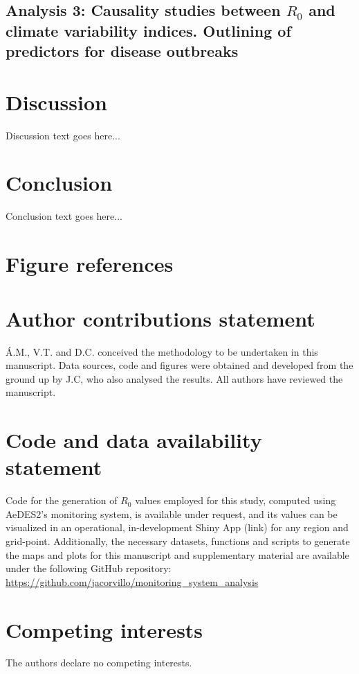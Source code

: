 \documentclass[article,10pt,twocolumn]{wlscirep}
\begin{document}
  \subsection{Analysis 3: Causality studies between $R_0$ and climate variability indices. Outlining of predictors for disease outbreaks} \label{sec-results-3}

  \section{Discussion}

  Discussion text goes here...

  \section{Conclusion}

  Conclusion text goes here...

% 

\section*{Figure references}

\section*{Author contributions statement}

Á.M., V.T. and D.C. conceived the methodology to be undertaken in this manuscript. Data sources, code and figures were obtained and developed from the ground up by J.C, who also analysed the results. All authors have reviewed the manuscript. 

\section*{Code and data availability statement}
    Code for the generation of $R_0$ values employed for this study, computed using AeDES2's monitoring system, is available under request, and its values can be visualized in an operational, in-development Shiny App (link) for any region and grid-point. Additionally, the necessary datasets, functions and scripts to generate the maps and plots for this manuscript and supplementary material are available under the following GitHub repository: \url{https://github.com/jacorvillo/monitoring_system_analysis}
\section*{Competing interests}
    The authors declare no competing interests.
\end{document}

